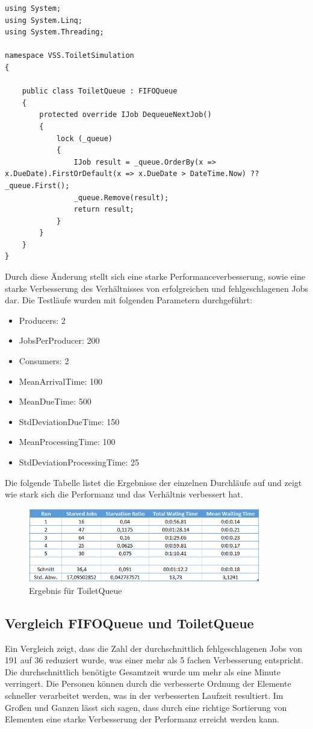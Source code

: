 \documentclass[a4paper,ngerman]{scrartcl}
\begin{document}
\begin{lstlisting}
using System;
using System.Linq;
using System.Threading;

namespace VSS.ToiletSimulation
{

    public class ToiletQueue : FIFOQueue
    {
        protected override IJob DequeueNextJob()
        {
            lock (_queue)
            {
                IJob result = _queue.OrderBy(x => x.DueDate).FirstOrDefault(x => x.DueDate > DateTime.Now) ?? _queue.First();
                _queue.Remove(result);
                return result;
            }
        }
    }
}
\end{lstlisting}

Durch diese Änderung stellt sich eine starke Performanceverbesserung, sowie eine starke Verbesserung des Verhältnisses von erfolgreichen
und fehlgeschlagenen Jobs dar. Die Testläufe wurden mit folgenden Parametern durchgeführt:

\begin{itemize}
	\item Producers: 2
	\item JobsPerProducer: 200
	\item Consumers: 2
	\item MeanArrivalTime: 100
	\item MeanDueTime: 500
	\item StdDeviationDueTime: 150
	\item MeanProcessingTime: 100
	\item StdDeviationProcessingTime: 25
\end{itemize}

Die folgende Tabelle listet die Ergebnisse der einzelnen Durchläufe auf und zeigt wie stark sich die Performanz und das Verhältnis verbessert hat.


\begin{figure}[h]
	\centering
		\includegraphics[width=0.9\textwidth]{images/ToiletQueueResult.PNG}
	\caption{Ergebnis für ToiletQueue}
	\label{fig:ToiletQueueResult}
\end{figure}

\subsection{Vergleich FIFOQueue und ToiletQueue}

Ein Vergleich zeigt, dass die Zahl der durchschnittlich fehlgeschlagenen Jobs von 191 auf 36 reduziert wurde, was einer mehr als 5 fachen Verbesserung entspricht. Die 
durchschnittlich benötigte Gesamtzeit wurde um mehr als eine Minute verringert. Die Personen können durch die verbesserte Ordnung der Elemente schneller verarbeitet werden,
was in der verbesserten Laufzeit resultiert. Im Großen und Ganzen lässt sich sagen, dass durch eine richtige Sortierung von Elementen eine starke Verbesserung der Performanz 
erreicht werden kann.
\end{document}
